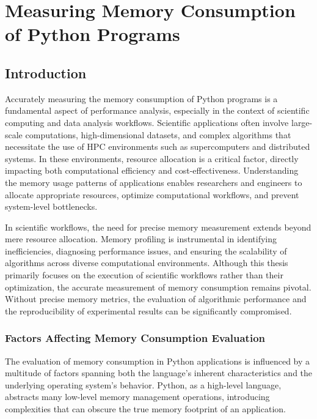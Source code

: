 \chapter{Measuring Memory Consumption of Python Programs}
\label{ch:measuring-memory-consumption}


\section{Introduction}
\label{sec:mmc-introduction}

Accurately measuring the memory consumption of Python programs is a fundamental aspect of performance analysis, especially in the context of scientific computing and data analysis workflows.
Scientific applications often involve large-scale computations, high-dimensional datasets, and complex algorithms that necessitate the use of \ac{HPC} environments such as supercomputers and distributed systems.
In these environments, resource allocation is a critical factor, directly impacting both computational efficiency and cost-effectiveness.
Understanding the memory usage patterns of applications enables researchers and engineers to allocate appropriate resources, optimize computational workflows, and prevent system-level bottlenecks.

In scientific workflows, the need for precise memory measurement extends beyond mere resource allocation.
Memory profiling is instrumental in identifying inefficiencies, diagnosing performance issues, and ensuring the scalability of algorithms across diverse computational environments.
Although this thesis primarily focuses on the execution of scientific workflows rather than their optimization, the accurate measurement of memory consumption remains pivotal.
Without precise memory metrics, the evaluation of algorithmic performance and the reproducibility of experimental results can be significantly compromised.

\subsection{Factors Affecting Memory Consumption Evaluation}

The evaluation of memory consumption in Python applications is influenced by a multitude of factors spanning both the language's inherent characteristics and the underlying operating system's behavior.
Python, as a high-level language, abstracts many low-level memory management operations, introducing complexities that can obscure the true memory footprint of an application.

